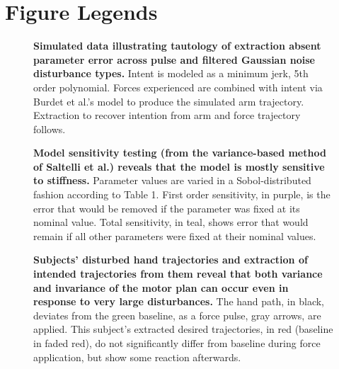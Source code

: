 \documentclass[10pt]{article}
\begin{document}


\section*{Figure Legends}

\begin{figure}[!ht]
\begin{center}
\end{center}
\caption{
{\bf Simulated data illustrating tautology of extraction absent parameter error across pulse and filtered Gaussian noise disturbance types.} Intent is modeled as a minimum jerk, 5th order polynomial. Forces experienced are combined with intent via Burdet et al.'s \cite{burdet2006stability} model to produce the simulated arm trajectory. Extraction to recover intention from arm and force trajectory follows.
}
\label{fig:synthetic}
\end{figure}

\begin{figure}[!ht]
\begin{center}
\end{center}
\caption{
{\bf Model sensitivity testing (from the variance-based method of Saltelli et al.\cite{saltelli2010variance}) reveals that the model is mostly sensitive to stiffness.} Parameter values are varied in a Sobol-distributed fashion according to Table 1. First order sensitivity, in purple, is the error that would be removed if the parameter was fixed at its nominal value. Total sensitivity, in teal, shows error that would remain if all other parameters were fixed at their nominal values.
}
\label{fig:sensitivity}
\end{figure}

\begin{figure}[!ht]
\begin{center}
\end{center}
\caption{
{\bf Subjects' disturbed hand trajectories and extraction of intended trajectories from them reveal that both variance and invariance of the motor plan can occur even in response to very large disturbances.} The hand path, in black, deviates from the green baseline, as a force pulse, gray arrows, are applied. This subject's extracted desired trajectories, in red (baseline in faded red), do not significantly differ from baseline during force application, but show some reaction afterwards.
}
\label{fig:anecdotes}
\end{figure}
\end{document}

